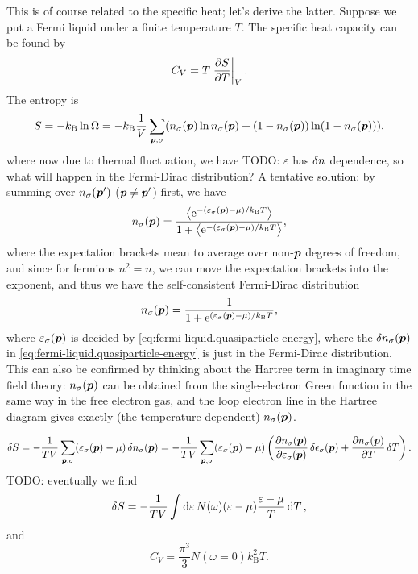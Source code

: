 \documentclass[hyperref, a4paper]{article}
\newcommand*{\ee}{\mathrm{e}}
\newcommand*{\kB}{k_{\text{B}}}
\begin{document}
This is of course related to the specific heat; 
let's derive the latter. 
Suppose we put a Fermi liquid under a finite temperature $T$.
The specific heat capacity can be found by 
\begin{equation}
    C_V = T \eval{\pdv{S}{T}}_V.
\end{equation}
The entropy is 
\begin{equation}
    S = - \kB \ln \Omega 
    = - \kB \frac{1}{V} \sum_{\vb*{p}, \sigma}
    (n_\sigma(\vb*{p}) \ln n_{\sigma}(\vb*{p})
    + (1 - n_\sigma(\vb*{p})) \ln (1 - n_{\sigma}(\vb*{p}))) ,
\end{equation} 
where now due to thermal fluctuation, 
we have TODO: $\varepsilon$ has $\var{n}$ dependence, 
so what will happen in the Fermi-Dirac distribution?
A tentative solution: 
by summing over $n_\sigma(\vb*{p}')$ ($\vb*{p} \neq \vb*{p}'$) first, 
we have 
\[
    n_\sigma(\vb*{p}) = \frac{
        \expval{\ee^{- (\varepsilon_\sigma(\vb*{p}) - \mu) / \kB T}}
    }{
        1 + \expval{\ee^{- (\varepsilon_\sigma(\vb*{p}) - \mu) / \kB T}}
    },
\]
where the expectation brackets mean 
to average over non-$\vb*{p}$ degrees of freedom, 
and since for fermions $n^2 = n$, 
we can move the expectation brackets into the exponent,
and thus we have the self-consistent Fermi-Dirac distribution
\begin{equation}
    n_\sigma(\vb*{p}) = \frac{1}{
        1 + \ee^{(\varepsilon_\sigma(\vb*{p}) - \mu) / \kB T}
    },
\end{equation}
where $\varepsilon_\sigma(\vb*{p})$ 
is decided by \eqref{eq:fermi-liquid.quasiparticle-energy}, 
where the $\var{n_\sigma(\vb*{p})}$ in \eqref{eq:fermi-liquid.quasiparticle-energy} 
is just in the Fermi-Dirac distribution.
This can also be confirmed by 
thinking about the Hartree term 
in imaginary time field theory:
$n_\sigma(\vb*{p})$ can be obtained from the single-electron Green function
in the same way in the free electron gas,
and the loop electron line in the Hartree diagram 
gives exactly (the temperature-dependent) $n_{\sigma}(\vb*{p})$.

\begin{equation}
    \var{S} = - \frac{1}{TV} \sum_{\vb*{p}, \sigma}
    (\varepsilon_{\sigma}(\vb*{p}) - \mu)
    \var{n_\sigma(\vb*{p})}
    = - \frac{1}{TV} \sum_{\vb*{p}, \sigma}
    (\varepsilon_{\sigma}(\vb*{p}) - \mu)
    \left(
        \pdv{n_\sigma(\vb*{p})}{\varepsilon_\sigma(\vb*{p})} \var{\epsilon_\sigma(\vb*{p})}
        + \pdv{n_\sigma(\vb*{p})}{T} \var{T}
    \right).
\end{equation}
TODO: eventually we find 
\begin{equation}
    \var{S} = - \frac{1}{TV} \int \dd{\varepsilon} N(\omega) 
    (\varepsilon - \mu) \frac{\varepsilon - \mu}{T} \dd{T},
\end{equation}
and 
\begin{equation}
    C_V = \frac{\pi^3}{3} N(\omega = 0) \kB^2 T.
\end{equation}
\end{document}
